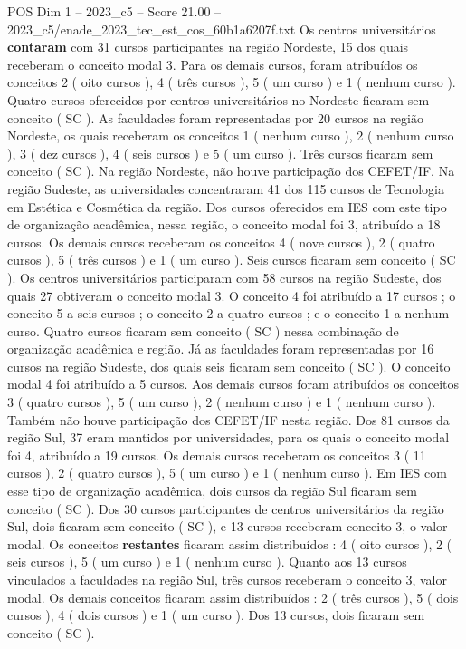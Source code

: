 \begin{textsample}{POS Dim 1 – 2023\_c5 – Score 21.00 – 2023\_c5/enade\_2023\_tec\_est\_cos\_60b1a6207f.txt}
Os centros universitários \textbf{contaram} com 31 cursos participantes na região Nordeste, 15 dos quais receberam o conceito modal 3.
Para os demais cursos, foram atribuídos os conceitos 2 ( oito cursos ), 4 ( três cursos ), 5 ( um curso ) e 1 ( nenhum curso ).
Quatro cursos oferecidos por centros universitários no Nordeste ficaram sem conceito ( SC ).
As faculdades foram representadas por 20 cursos na região Nordeste, os quais receberam os conceitos 1 ( nenhum curso ), 2 ( nenhum curso ), 3 ( dez cursos ), 4 ( seis cursos ) e 5 ( um curso ).
Três cursos ficaram sem conceito ( SC ).
Na região Nordeste, não houve participação dos CEFET/IF.
Na região Sudeste, as universidades concentraram 41 dos 115 cursos de Tecnologia em Estética e Cosmética da região.
Dos cursos oferecidos em IES com este tipo de organização acadêmica, nessa região, o conceito modal foi 3, atribuído a 18 cursos.
Os demais cursos receberam os conceitos 4 ( nove cursos ), 2 ( quatro cursos ), 5 ( três cursos ) e 1 ( um curso ).
Seis cursos ficaram sem conceito ( SC ).
Os centros universitários participaram com 58 cursos na região Sudeste, dos quais 27 obtiveram o conceito modal 3.
O conceito 4 foi atribuído a 17 cursos ; o conceito 5 a seis cursos ; o conceito 2 a quatro cursos ; e o conceito 1 a nenhum curso.
Quatro cursos ficaram sem conceito ( SC ) nessa combinação de organização acadêmica e região.
Já as faculdades foram representadas por 16 cursos na região Sudeste, dos quais seis ficaram sem conceito ( SC ).
O conceito modal 4 foi atribuído a 5 cursos.
Aos demais cursos foram atribuídos os conceitos 3 ( quatro cursos ), 5 ( um curso ), 2 ( nenhum curso ) e 1 ( nenhum curso ).
Também não houve participação dos CEFET/IF nesta região.
Dos 81 cursos da região Sul, 37 eram mantidos por universidades, para os quais o conceito modal foi 4, atribuído a 19 cursos.
Os demais cursos receberam os conceitos 3 ( 11 cursos ), 2 ( quatro cursos ), 5 ( um curso ) e 1 ( nenhum curso ).
Em IES com esse tipo de organização acadêmica, dois cursos da região Sul ficaram sem conceito ( SC ).
Dos 30 cursos participantes de centros universitários da região Sul, dois ficaram sem conceito ( SC ), e 13 cursos receberam conceito 3, o valor modal.
Os conceitos \textbf{restantes} ficaram assim distribuídos : 4 ( oito cursos ), 2 ( seis cursos ), 5 ( um curso ) e 1 ( nenhum curso ).
Quanto aos 13 cursos vinculados a faculdades na região Sul, três cursos receberam o conceito 3, valor modal.
Os demais conceitos ficaram assim distribuídos : 2 ( três cursos ), 5 ( dois cursos ), 4 ( dois cursos ) e 1 ( um curso ).
Dos 13 cursos, dois ficaram sem conceito ( SC ).

\end{textsample}
